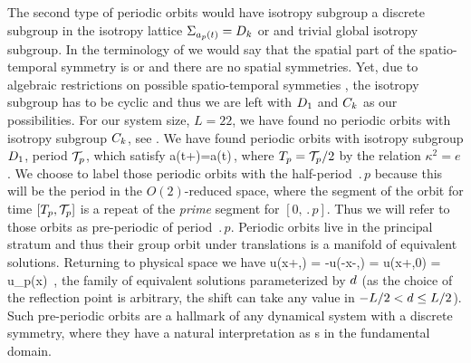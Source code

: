 The second type of periodic orbits would have isotropy subgroup a discrete
subgroup in the isotropy lattice $\Sigma_{a_p(t)}=D_{k}$ or  and trivial global
isotropy subgroup. In the terminology
of  we would say that the spatial part of the spatio-temporal symmetry
is  or  and there are no spatial symmetries. Yet, due to algebraic restrictions on possible spatio-temporal symmeties \cite[Chapter 3]{golubitsky2002sp}, the isotropy subgroup has to be
cyclic and thus we are left with $D_{1}$ and $C_{k}$ as our possibilities. For our system size, $L=22$,
we have found no periodic orbits with isotropy subgroup $C_{k}$, see .
We have found periodic orbits with isotropy subgroup $D_{1}$, period ${\mathcal{T}_{p}}$, which satisfy
\beq
	\Refl a(t+)=a(t)\,,
	\label{eq:ppo}
\eeq
where ${T_{p}}={\mathcal{T}_{p}}/2$ by the relation $\kappa^2=e$. We choose to label those
periodic orbits with the half-period $\period{p}$ because this will be the period in the $O(2)$-reduced space,
where the segment of the orbit for time $[{T_{p}},{\mathcal{T}_{p}}]$ is a repeat of the \emph{prime} segment
for $[0,\period{p}]$. Thus we will refer to those orbits as pre-periodic of period $\period{p}$.
Periodic orbits  live in the principal stratum and thus their group orbit under translations  is a manifold of equivalent solutions. Returning to physical space we have
\beq
  \Refl u(x+\shift,) =
  -u(-x-\shift,) = u(x+\shift,0) = u_p(x)
  \,,
\label{KSpos}
\eeq
the family of equivalent solutions
parameterized by $d$
(as the choice of the reflection point is arbitrary,
the shift can take any value in $-L/2 < d \leq L/2$).
Such pre-periodic orbits
are a hallmark of any dynamical system with a discrete
symmetry, where they have a natural
interpretation as \po s in the
fundamental domain.

